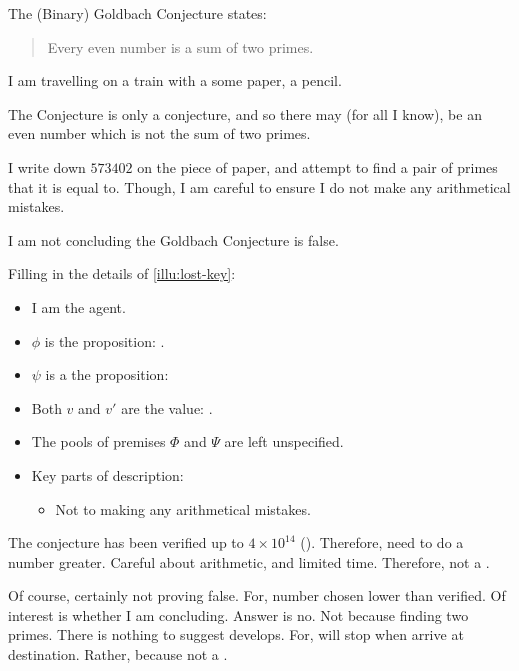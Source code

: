 \begin{note}
  \begin{illustration}%
    The (Binary) Goldbach Conjecture states:

    \begin{quote}
      Every even number is a sum of two primes.
    \end{quote}

    I am travelling on a train with a some paper, a pencil.

    The Conjecture is only a conjecture, and so there may (for all I know), be an even number which is not the sum of two primes.

    I write down \(573402\) on the piece of paper, and attempt to find a pair of primes that it is equal to.
    Though, I am careful to ensure I do not make any arithmetical mistakes.

    I am not concluding the Goldbach Conjecture is false.
  \end{illustration}

  Filling in the details of \autoref{illu:lost-key}:

  \begin{itemize}[noitemsep]
  \item
    I am the agent.
  \item
    \(\phi\) is the proposition: .
  \item
    \(\psi\) is a the proposition: 
  \item
    Both \(v\) and \(v'\) are the value: .
  \item
    The pools of premises \(\Phi\) and \(\Psi\) are left unspecified.
  \item
    Key parts of description:
    \begin{itemize}
    \item
      Not to making any arithmetical mistakes.
    \end{itemize}
  \end{itemize}

  The conjecture has been verified up to \(4 \times 10^{14}\) (\cite[cf.][]{Richstein:2001aa}).
  Therefore, need to do a number greater.
  Careful about arithmetic, and limited time.
  Therefore, not a .

  Of course, certainly not proving false.
  For, number chosen lower than verified.
  Of interest is whether I am concluding.
  Answer is no.
  Not because finding two primes.
  There is nothing to suggest develops.
  For, will stop when arrive at destination.
  Rather, because not a .
\end{note}

